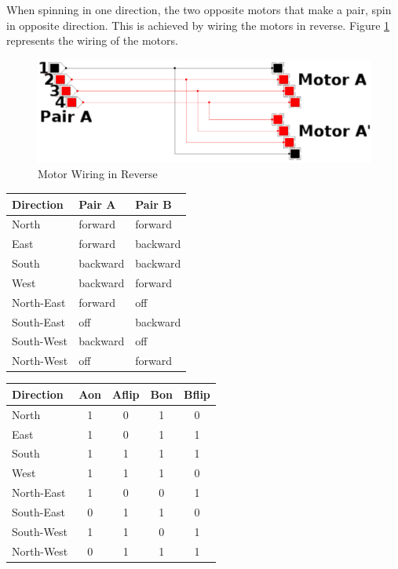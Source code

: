 When spinning in one direction, the two opposite motors that make a pair, spin in opposite 
direction. This is achieved by wiring the motors in reverse. Figure \ref{fig:reverse_wiring}
represents the wiring of the motors.
\begin{figure}[htp]
	\centering
	\includegraphics[width=\textwidth]{figures/move/motor_pairs_cedar.png}
	\caption{Motor Wiring in Reverse}
	\label{fig:reverse_wiring}
\end{figure}
\begin{center}
	\begin{tabular}{|l|l|l|}
		\hline
		Direction & Pair A & Pair B	\\
		\hline
		North & forward & forward \\
		East 	& forward & backward \\
		South & backward & backward \\
		West 	& backward & forward \\
		\hline
		North-East & forward & off \\
		South-East & off & backward \\
		South-West & backward & off\\
		North-West & off & forward \\
		\hline
	\end{tabular}
	\begin{tabular}{|l|c|c|c|c|}
		\hline
		Direction & Aon & Aflip & Bon & Bflip \\
		\hline
		North & 1 & 0 & 1 & 0 \\
		East 	& 1 & 0 & 1 & 1 \\
		South & 1 & 1 & 1 & 1 \\
		West 	& 1 & 1 & 1 & 0 \\
		\hline
		North-East & 1 & 0 & 0 & 1 \\
		South-East & 0 & 1 & 1 & 0 \\
		South-West & 1 & 1 & 0 & 1 \\
		North-West & 0 & 1 & 1 & 1 \\
		\hline
	\end{tabular}
	\label{table:directions}
\end{center}